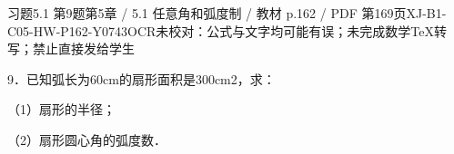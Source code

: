 \begin{bankitem}{习题5.1 第9题}{第5章 / 5.1 任意角和弧度制 / 教材 p.162 / PDF 第169页}{XJ-B1-C05-HW-P162-Y0743}{OCR未校对：公式与文字均可能有误；未完成数学TeX转写；禁止直接发给学生}
\begin{ocrdraft}
\par
9．已知弧长为60cm的扇形面积是300cm2，求：
\par
（1）扇形的半径；
\par
（2）扇形圆心角的弧度数．
\end{ocrdraft}
\end{bankitem}
